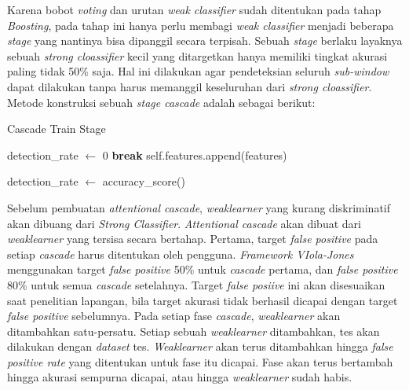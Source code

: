 Karena bobot \textit{voting} dan urutan \textit{weak classifier} sudah ditentukan pada 
tahap \textit{Boosting}, pada tahap ini hanya perlu membagi \textit{weak classifier} menjadi 
beberapa \textit{stage} yang nantinya bisa dipanggil secara terpisah. Sebuah \textit{stage} 
berlaku layaknya sebuah \textit{strong cloassifier} kecil yang ditargetkan hanya memiliki 
tingkat akurasi paling tidak 50\% saja. Hal ini dilakukan agar pendeteksian seluruh \textit{sub-window} 
dapat dilakukan tanpa harus memanggil keseluruhan dari \textit{strong cloassifier}. 
Metode konstruksi sebuah \textit{stage cascade} adalah sebagai berikut:

\begin{algorithm}
  \caption{Cascade Train Stage}
  \begin{algorithmic}[1]
      \State detection\_rate $\gets$ 0
          \State \textbf{break}
        \EndIf
        \State self.features.append(features)

        \State detection\_rate $\gets$ accuracy\_score()
      \EndWhile
    \EndFunction
  \end{algorithmic}
\end{algorithm}

Sebelum pembuatan \emph{attentional cascade}, \emph{weaklearner} yang kurang 
diskriminatif akan dibuang dari \emph{Strong Classifier}. 
\emph{Attentional cascade} akan dibuat dari \emph{weaklearner} 
yang tersisa secara bertahap. 
Pertama, target \textit{false positive} pada setiap \emph{cascade} 
harus ditentukan oleh pengguna. \emph{Framework VIola-Jones} menggunakan target 
\textit{false positive} 50\% untuk \emph{cascade} pertama, dan 
\textit{false positive} 80\% untuk semua \emph{cascade} setelahnya.
Target \textit{false posiive} ini akan disesuaikan 
saat penelitian lapangan, bila target akurasi tidak berhasil dicapai 
dengan target \textit{false positive} sebelumnya.
Pada setiap fase \emph{cascade}, \emph{weaklearner} akan 
ditambahkan satu-persatu. Setiap sebuah \emph{weaklearner} ditambahkan, tes akan dilakukan 
dengan \emph{dataset} tes. \emph{Weaklearner} akan terus ditambahkan hingga \emph{false positive rate} 
yang ditentukan untuk fase itu dicapai. Fase akan terus bertambah hingga 
akurasi sempurna dicapai, atau hingga \emph{weaklearner} sudah habis. 


